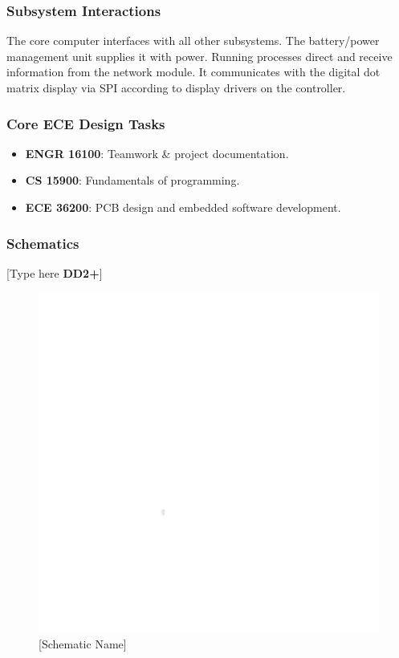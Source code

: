 \subsubsection{Subsystem Interactions}
The core computer interfaces with
all other subsystems. The battery/power
management unit supplies it with power.
Running processes direct and receive
information from the network module.
It communicates with the digital dot matrix
display via SPI according to display
drivers on the controller.


\subsubsection{Core ECE Design Tasks}
\begin{itemize}
    \item \textbf{ENGR 16100}: Teamwork \& project documentation.
    \item \textbf{CS 15900}: Fundamentals of programming.
    \item \textbf{ECE 36200}: PCB design and embedded software development.
\end{itemize}

\subsubsection{Schematics}
[Type here \textbf{DD2+}]
\begin{figure}[h]
    \centering
    \includegraphics[width=16cm]{images/white.png} %
    \caption{[Schematic Name]}
\end{figure} %

